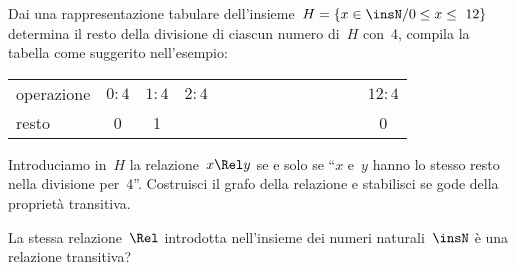 \begin{esercizio}
\label{ese:B.25}
Dai una rappresentazione tabulare 
dell'insieme~$H = \{ x \in \insN / 0 \leq x \leq~12 \}$ 
determina il resto della divisione di ciascun numero di~$H$ con~4,
compila la tabella come suggerito nell'esempio:
\begin{center}
\begin{tabular}{lccccccccccccc}
\toprule
operazione & $0:4$ & $1:4$ & $2:4$ & & & & & & & & & & $12:4$ \\
resto & 0 & 1 & & & & & & & & & & & 0 \\
\bottomrule
\end{tabular}
\end{center}
Introduciamo in~$H$ la relazione~$x \Rel y$ se e solo se ``$x$ e~$y$ hanno lo 
stesso resto nella divisione per~4''.
Costruisci il grafo della relazione e stabilisci se gode della proprietà 
transitiva.

La stessa relazione~$\Rel$ introdotta nell'insieme dei numeri naturali~$\insN$ 
è una relazione transitiva?
\end{esercizio}

